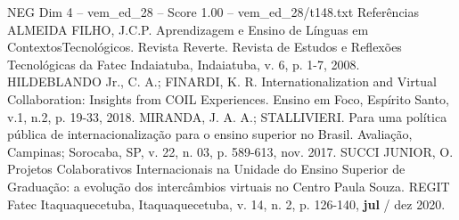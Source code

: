 \begin{textsample}{NEG Dim 4 – vem\_ed\_28 – Score 1.00 – vem\_ed\_28/t148.txt}
Referências ALMEIDA FILHO, J.C.P.
Aprendizagem e Ensino de Línguas em ContextosTecnológicos.
Revista Reverte.
Revista de Estudos e Reflexões Tecnológicas da Fatec Indaiatuba, Indaiatuba, v. 6, p. 1-7, 2008.
HILDEBLANDO Jr., C.
A.; FINARDI, K.
R.
Internationalization and Virtual Collaboration: Insights from COIL Experiences.
Ensino em Foco, Espírito Santo, v.1, n.2, p. 19-33, 2018.
MIRANDA, J.
A.
A.; STALLIVIERI.
Para uma política pública de internacionalização para o ensino superior no Brasil.
Avaliação, Campinas; Sorocaba, SP, v. 22, n. 03, p. 589-613, nov. 2017.
SUCCI JUNIOR, O.
Projetos Colaborativos Internacionais na Unidade do Ensino Superior de Graduação: a evolução dos intercâmbios virtuais no Centro Paula Souza.
REGIT Fatec Itaquaquecetuba, Itaquaquecetuba, v. 14, n. 2, p. 126-140, \textbf{jul} / dez 2020.

\end{textsample}
